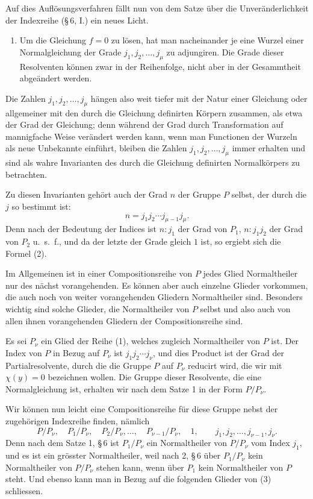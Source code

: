 \documentclass[11pt]{article}
\begin{document}
Auf dies Auflösungsverfahren fällt nun von dem Satze über die Unveränderlichkeit der Indexreihe (\S\,6, I.) ein neues Licht.

\begin{enumerate}[label=\arabic*.,leftmargin=2.6em,start=2]
\item Um die Gleichung $f=0$ zu lösen, hat man nacheinander je eine Wurzel einer Normalgleichung der Grade $j_1,j_2,\ldots,j_\mu$ zu adjungiren. Die Grade dieser Resolventen können zwar in der Reihenfolge, nicht aber in der Gesammtheit abgeändert werden.
\end{enumerate}

Die Zahlen $j_1,j_2,\ldots,j_\mu$ hängen also weit tiefer mit der Natur einer Gleichung oder allgemeiner mit den durch die Gleichung definirten Körpern zusammen, als etwa der Grad der Gleichung; denn während der Grad durch Transformation auf mannigfache Weise verändert werden kann, wenn man Functionen der Wurzeln als neue Unbekannte einführt, bleiben die Zahlen $j_1,j_2,\ldots,j_\mu$ immer erhalten und sind als wahre Invarianten des durch die Gleichung definirten Normalkörpers zu betrachten.

Zu diesen Invarianten gehört auch der Grad $n$ der Gruppe $P$ selbst, der durch die $j$ so bestimmt ist:
\begin{equation}
 n=j_1j_2\cdots j_{\mu-1}j_\mu .
 \tag{2}
\end{equation}
Denn nach der Bedeutung der Indices ist $n:j_1$ der Grad von $P_1$, $n:j_1j_2$ der Grad von $P_2$ u.\ s.\ f., und da der letzte der Grade gleich $1$ ist, so ergiebt sich die Formel (2).

Im Allgemeinen ist in einer Compositionsreihe von $P$ jedes Glied Normaltheiler nur des nächst vorangehenden. Es können aber auch einzelne Glieder vorkommen, die auch noch von weiter vorangehenden Gliedern Normaltheiler sind. Besonders wichtig sind solche Glieder, die Normaltheiler von $P$ selbst und also auch von allen ihnen vorangehenden Gliedern der Compositionsreihe sind.

Es sei $P_\nu$ ein Glied der Reihe (1), welches zugleich Normaltheiler von $P$ ist. Der Index von $P$ in Bezug auf $P_\nu$ ist $j_1j_2\cdots j_\nu$, und dies Product ist der Grad der Partialresolvente, durch die die Gruppe $P$ auf $P_\nu$ reducirt wird, die wir mit $\chi(y)=0$ bezeichnen wollen. Die Gruppe dieser Resolvente, die eine Normalgleichung ist, erhalten wir nach dem Satze 1 in der Form $P/P_\nu$.

Wir können nun leicht eine Compositionsreihe für diese Gruppe nebst der zugehörigen Indexreihe finden, nämlich
\begin{equation}
 P/P_\nu,\quad P_1/P_\nu,\quad P_2/P_\nu,\ldots,\quad P_{\nu-1}/P_\nu,\quad 1,
 \qquad j_1,j_2,\ldots,j_{\nu-1},j_\nu .
 \tag{3}
\end{equation}
Denn nach dem Satze 1, \S\,6 ist $P_1/P_\nu$ ein Normaltheiler von $P/P_\nu$ vom Index $j_1$, und es ist ein grösster Normaltheiler, weil nach 2, \S\,6 über $P_1/P_\nu$ kein Normaltheiler von $P/P_\nu$ stehen kann, wenn über $P_1$ kein Normaltheiler von $P$ steht. Und ebenso kann man in Bezug auf die folgenden Glieder von (3) schliessen.
\end{document}
